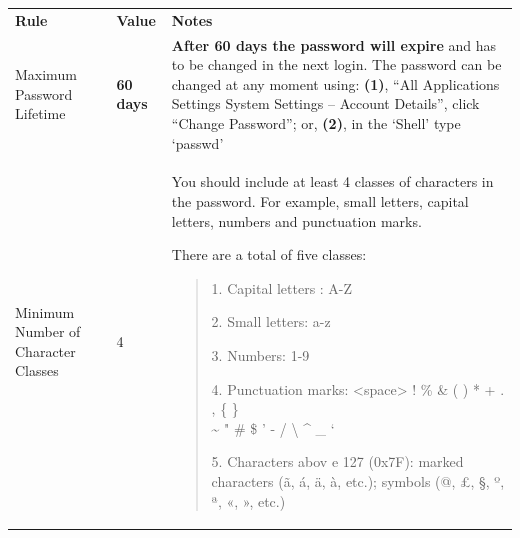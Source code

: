 \documentclass[]{book}
\begin{document}
\begin{longtable}[]{@{}lll@{}}
\toprule
\endhead
\begin{minipage}[t]{0.30\columnwidth}\raggedright
\textbf{Rule}\strut
\end{minipage} & \begin{minipage}[t]{0.30\columnwidth}\raggedright
\textbf{Value}\strut
\end{minipage} & \begin{minipage}[t]{0.30\columnwidth}\raggedright
\textbf{Notes }\strut
\end{minipage}\tabularnewline
\begin{minipage}[t]{0.30\columnwidth}\raggedright
Maximum Password
Lifetime\strut
\end{minipage} & \begin{minipage}[t]{0.30\columnwidth}\raggedright
\textbf{{60
days}}\strut
\end{minipage} & \begin{minipage}[t]{0.30\columnwidth}\raggedright
\textbf{{After 60 days the
password will
expire}}
and has to be changed
in the next login.
The password can be
changed at any moment
using: \textbf{(1)}, ``All
Applications \textbar{}
Settings \textbar{} System
Settings -- Account
Details'', click
``Change Password'';
or, \textbf{(2)}, in the
`Shell' type `passwd'\strut
\end{minipage}\tabularnewline
\begin{minipage}[t]{0.30\columnwidth}\raggedright
Minimum Number of
Character Classes\strut
\end{minipage} & \begin{minipage}[t]{0.30\columnwidth}\raggedright
4\strut
\end{minipage} & \begin{minipage}[t]{0.30\columnwidth}\raggedright
You should include at
least 4 classes of
characters in the
password. For
example, small
letters, capital
letters, numbers and
punctuation marks.

There are a total of
five classes:

\begin{quote}
1. Capital letters
:
A-Z

2. Small letters:
a-z

3. Numbers: 1-9

4. Punctuation
marks: \textless{}space\textgreater{} !
\% \& ( ) * + . , \{
\} \[ \] \textasciitilde{} " \# \$
' - / \textbackslash{} \^{} \_ `
\textbar{}

5. Characters abov
e
127 (0x7F): marked
characters (ã, á,
ä, à, etc.);
symbols (@, £, §,
º, ª, «, », etc.)
\end{quote}


\end{minipage}
\end{longtable}
\end{document}

